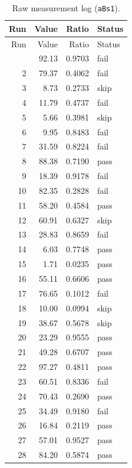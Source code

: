\begin{longtable}{rrrl}
\caption{Raw measurement log (\texttt{aBs1}).}\label{tab:aBs1-long}\\
\toprule Run & Value & Ratio & Status \\ \midrule \endfirsthead
\toprule Run & Value & Ratio & Status \\ \midrule \endhead
\bottomrule \endfoot
1 & \num{92.13} & \num{0.9703} & fail \\
2 & \num{79.37} & \num{0.4062} & fail \\
3 & \num{8.73} & \num{0.2733} & skip \\
4 & \num{11.79} & \num{0.4737} & fail \\
5 & \num{5.66} & \num{0.3981} & skip \\
6 & \num{9.95} & \num{0.8483} & fail \\
7 & \num{31.59} & \num{0.8224} & fail \\
8 & \num{88.38} & \num{0.7190} & pass \\
9 & \num{18.39} & \num{0.9178} & fail \\
10 & \num{82.35} & \num{0.2828} & fail \\
11 & \num{58.20} & \num{0.4584} & pass \\
12 & \num{60.91} & \num{0.6327} & skip \\
13 & \num{28.83} & \num{0.8659} & fail \\
14 & \num{6.03} & \num{0.7748} & pass \\
15 & \num{1.71} & \num{0.0235} & pass \\
16 & \num{55.11} & \num{0.6606} & pass \\
17 & \num{76.65} & \num{0.1012} & fail \\
18 & \num{10.00} & \num{0.0994} & skip \\
19 & \num{38.67} & \num{0.5678} & skip \\
20 & \num{23.29} & \num{0.9555} & pass \\
21 & \num{49.28} & \num{0.6707} & pass \\
22 & \num{97.27} & \num{0.4811} & pass \\
23 & \num{60.51} & \num{0.8336} & fail \\
24 & \num{70.43} & \num{0.2690} & pass \\
25 & \num{34.49} & \num{0.9180} & fail \\
26 & \num{16.84} & \num{0.2119} & pass \\
27 & \num{57.01} & \num{0.9527} & pass \\
28 & \num{84.20} & \num{0.5874} & pass \\

\end{longtable}
